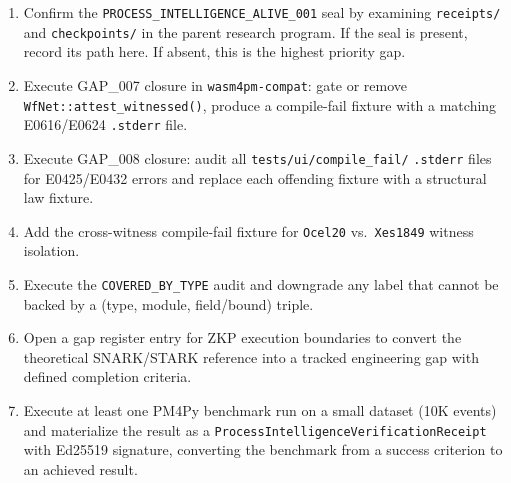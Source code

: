 \begin{enumerate}
  \item Confirm the \texttt{PROCESS\_INTELLIGENCE\_ALIVE\_001} seal by examining
    \texttt{receipts/} and \texttt{checkpoints/} in the parent research program.
    If the seal is present, record its path here. If absent, this is the highest
    priority gap.
  \item Execute GAP\_007 closure in \texttt{wasm4pm-compat}: gate or remove
    \texttt{WfNet::attest\_witnessed()}, produce a compile-fail fixture with a
    matching E0616/E0624 \texttt{.stderr} file.
  \item Execute GAP\_008 closure: audit all \texttt{tests/ui/compile\_fail/}
    \texttt{.stderr} files for E0425/E0432 errors and replace each offending fixture
    with a structural law fixture.
  \item Add the cross-witness compile-fail fixture for \texttt{Ocel20} vs.\
    \texttt{Xes1849} witness isolation.
  \item Execute the \texttt{COVERED\_BY\_TYPE} audit and downgrade any label that
    cannot be backed by a (type, module, field/bound) triple.
  \item Open a gap register entry for ZKP execution boundaries to convert the
    theoretical SNARK/STARK reference into a tracked engineering gap with defined
    completion criteria.
  \item Execute at least one PM4Py benchmark run on a small dataset (10K events) and
    materialize the result as a \texttt{ProcessIntelligenceVerificationReceipt} with
    Ed25519 signature, converting the benchmark from a success criterion to an
    achieved result.
\end{enumerate}
